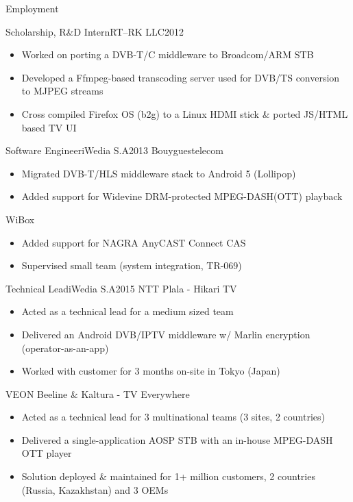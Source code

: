 \documentclass[]{mcdowellcv}
\begin{document}
	\makeheader

	\begin{cvsection}{Employment}
		\begin{cvsubsection}{Scholarship, R\&D Intern}{RT--RK LLC}{2012}
			\begin{itemize}
				\item Worked on porting a DVB-T/C middleware to Broadcom/ARM STB
				\item Developed a Ffmpeg-based transcoding server used for DVB/TS conversion to MJPEG streams
				\item Cross compiled Firefox OS (b2g) to a Linux HDMI stick \& ported JS/HTML based TV UI
			\end{itemize}
		\end{cvsubsection}

		\begin{cvsubsection}{Software Engineer}{iWedia S.A}{2013}
			Bouyguestelecom
			\begin{itemize}
				\item Migrated DVB-T/HLS middleware stack to Android 5 (Lollipop)
				\item Added support for Widevine DRM-protected MPEG-DASH(OTT) playback
			\end{itemize}
			WiBox
			\begin{itemize}
				\item Added support for NAGRA AnyCAST Connect CAS
				\item Supervised small team (system integration, TR-069)
			\end{itemize}
		\end{cvsubsection}

		\begin{cvsubsection}{Technical Lead}{iWedia S.A}{2015}
			NTT Plala - Hikari TV
			\begin{itemize}
				\item Acted as a technical lead for a medium sized team
				\item Delivered an Android DVB/IPTV middleware w/ Marlin encryption (operator-as-an-app)
				\item Worked with customer for 3 months on-site in Tokyo (Japan)
			\end{itemize}
			VEON Beeline \& Kaltura - TV Everywhere
			\begin{itemize}
				\item Acted as a technical lead for 3 multinational teams (3 sites, 2 countries)
				\item Delivered a single-application AOSP STB with an in-house MPEG-DASH OTT player
				\item Solution deployed \& maintained for 1+ million customers, 2 countries (Russia, Kazakhstan) and 3 OEMs
			\end{itemize}
		\end{cvsubsection}


\end{cvsection}
\end{document}
